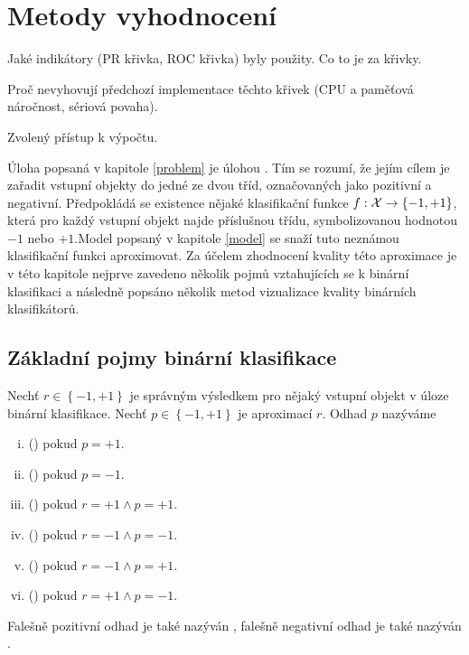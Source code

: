 \chapter{Metody vyhodnocení}

Jaké indikátory (PR křivka, ROC křivka) byly použity. Co to je za křivky.

Proč nevyhovují předchozí implementace těchto křivek (CPU a paměťová náročnost, sériová povaha).

Zvolený přístup k výpočtu.

Úloha popsaná v kapitole \ref{problem} je úlohou . Tím se rozumí, že jejím cílem je zařadit vstupní objekty do jedné ze dvou tříd, označovaných jako pozitivní a negativní. Předpokládá se existence nějaké klasifikační funkce \( f : \mathcal X \to \left\{ -1, +1 \right\} \), která pro každý vstupní objekt najde příslušnou třídu, symbolizovanou hodnotou \( -1 \) nebo \( +1 \).Model popsaný v kapitole \ref{model} se snaží tuto neznámou klasifikační funkci aproximovat. Za účelem zhodnocení kvality této aproximace je v této kapitole nejprve zavedeno několik pojmů vztahujících se k binární klasifikaci a následně popsáno několik metod vizualizace kvality binárních klasifikátorů. 

\section{Základní pojmy binární klasifikace}

\begin{define}
	Nechť \( r \in \left\{ -1, +1 \right\} \) je správným výsledkem pro nějaký vstupní objekt v úloze binární klasifikace. Nechť \( p \in \left\{ -1, +1 \right\} \) je aproximací \( r \). Odhad \( p \) nazýváme
	\begin{enumerate}[i.]
		\item {} () pokud \( p = +1 \).
		\item {} () pokud \( p = -1 \).
		\item {} () pokud \( r = +1 \land p = +1 \).
		\item {} () pokud \( r = -1 \land p = -1 \).
		\item {} () pokud \( r = -1 \land p = +1 \).
		\item {} () pokud \( r = +1 \land p = -1 \).
	\end{enumerate}
	Falešně pozitivní odhad je také nazýván , falešně negativní odhad je také nazýván .
\end{define}

